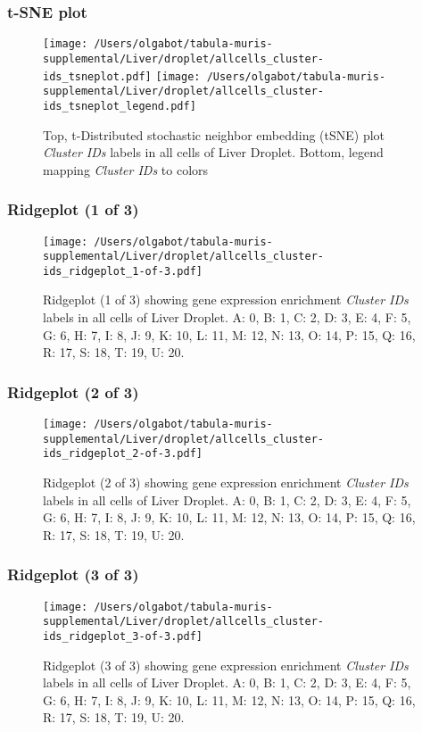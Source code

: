 \clearpage
\subsubsection{t-SNE plot}
\begin{figure}[h]
\centering
\texttt{[image: /Users/olgabot/tabula-muris-supplemental/Liver/droplet/allcells\_cluster-ids\_tsneplot.pdf]}
\texttt{[image: /Users/olgabot/tabula-muris-supplemental/Liver/droplet/allcells\_cluster-ids\_tsneplot\_legend.pdf]}
\caption{Top, t-Distributed stochastic neighbor embedding (tSNE) plot  \emph{Cluster IDs} labels in all cells of Liver Droplet. Bottom, legend mapping \emph{Cluster IDs} to colors}
\end{figure}


\clearpage

\subsubsection{Ridgeplot (1 of 3)}
\begin{figure}[h]
\centering
\texttt{[image: /Users/olgabot/tabula-muris-supplemental/Liver/droplet/allcells\_cluster-ids\_ridgeplot\_1-of-3.pdf]}

\caption{ Ridgeplot (1 of 3)  showing gene expression enrichment \emph{Cluster IDs} labels in all cells of Liver Droplet. A: 0, B: 1, C: 2, D: 3, E: 4, F: 5, G: 6, H: 7, I: 8, J: 9, K: 10, L: 11, M: 12, N: 13, O: 14, P: 15, Q: 16, R: 17, S: 18, T: 19, U: 20.}
\end{figure}


\clearpage

\subsubsection{Ridgeplot (2 of 3)}
\begin{figure}[h]
\centering
\texttt{[image: /Users/olgabot/tabula-muris-supplemental/Liver/droplet/allcells\_cluster-ids\_ridgeplot\_2-of-3.pdf]}

\caption{ Ridgeplot (2 of 3)  showing gene expression enrichment \emph{Cluster IDs} labels in all cells of Liver Droplet. A: 0, B: 1, C: 2, D: 3, E: 4, F: 5, G: 6, H: 7, I: 8, J: 9, K: 10, L: 11, M: 12, N: 13, O: 14, P: 15, Q: 16, R: 17, S: 18, T: 19, U: 20.}
\end{figure}


\clearpage

\subsubsection{Ridgeplot (3 of 3)}
\begin{figure}[h]
\centering
\texttt{[image: /Users/olgabot/tabula-muris-supplemental/Liver/droplet/allcells\_cluster-ids\_ridgeplot\_3-of-3.pdf]}

\caption{ Ridgeplot (3 of 3)  showing gene expression enrichment \emph{Cluster IDs} labels in all cells of Liver Droplet. A: 0, B: 1, C: 2, D: 3, E: 4, F: 5, G: 6, H: 7, I: 8, J: 9, K: 10, L: 11, M: 12, N: 13, O: 14, P: 15, Q: 16, R: 17, S: 18, T: 19, U: 20.}
\end{figure}


